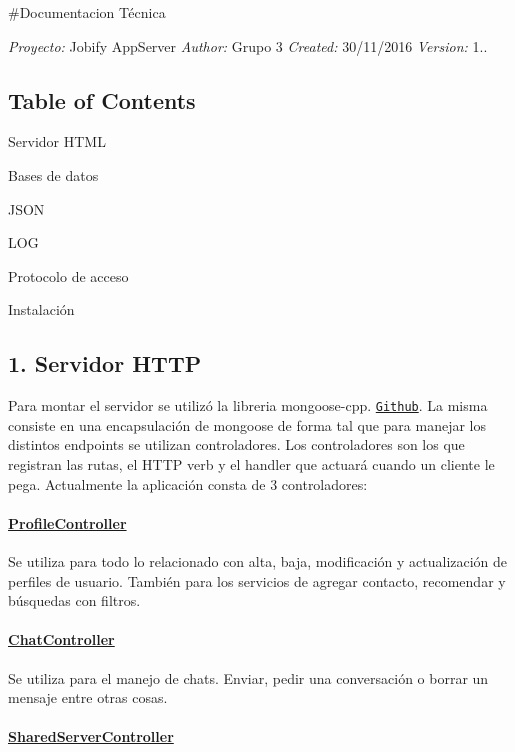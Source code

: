 \#\+Documentacion Técnica 

 {\itshape Proyecto\+:} Jobify App\+Server {\itshape Author\+:} Grupo 3 {\itshape Created\+:} 30/11/2016 {\itshape Version\+:} 1.. 



\subsection*{Table of Contents}


\begin{DoxyEnumerate}
\item Servidor H\+T\+ML
\item Bases de datos
\item J\+S\+ON
\item L\+OG
\item Protocolo de acceso
\item Instalación 


\end{DoxyEnumerate}

\subsection*{1. Servidor H\+T\+TP}

Para montar el servidor se utilizó la libreria mongoose-\/cpp. \href{https://github.com/Gregwar/mongoose-cpp}{\tt Github}. La misma consiste en una encapsulación de mongoose de forma tal que para manejar los distintos endpoints se utilizan controladores. Los controladores son los que registran las rutas, el H\+T\+TP verb y el handler que actuará cuando un cliente le pega. Actualmente la aplicación consta de 3 controladores\+: \paragraph*{\hyperlink{classProfileController}{Profile\+Controller}}

Se utiliza para todo lo relacionado con alta, baja, modificación y actualización de perfiles de usuario. También para los servicios de agregar contacto, recomendar y búsquedas con filtros. \paragraph*{\hyperlink{classChatController}{Chat\+Controller}}

Se utiliza para el manejo de chats. Enviar, pedir una conversación o borrar un mensaje entre otras cosas. \paragraph*{\hyperlink{classSharedServerController}{Shared\+Server\+Controller}}

